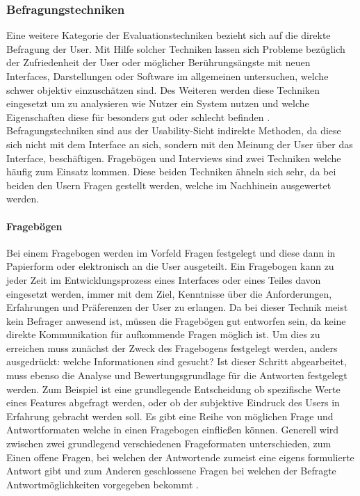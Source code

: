 \documentclass[draft=false
              ,paper=a4
              ,twoside=false
              ,fontsize=11pt
              ,headsepline
              ,BCOR10mm
              ,DIV11
              ]{scrbook}
\begin{document}
\subsubsection{Befragungstechniken} %
\label{ssub:befragungstechniken}
Eine weitere Kategorie der Evaluationstechniken bezieht sich auf die direkte Befragung der User. Mit Hilfe solcher Techniken lassen sich Probleme bezüglich der Zufriedenheit der User oder möglicher Berührungsängste mit neuen Interfaces, Darstellungen oder Software im allgemeinen untersuchen, welche schwer objektiv einzuschätzen sind. Des Weiteren werden diese Techniken eingesetzt um zu analysieren wie Nutzer ein System nutzen und welche Eigenschaften diese für besonders gut oder schlecht befinden \cite{nielsen_usability_1994}. Befragungstechniken sind aus der Usability-Sicht indirekte Methoden, da diese sich nicht mit dem Interface an sich, sondern mit den Meinung der User über das Interface, beschäftigen. Fragebögen und Interviews sind zwei Techniken welche häufig zum Einsatz kommen. Diese beiden Techniken ähneln sich sehr, da bei beiden den Usern Fragen gestellt werden, welche im Nachhinein ausgewertet werden. 

\paragraph{Fragebögen} %
\label{par:fragebögen}
Bei einem Fragebogen werden im Vorfeld Fragen festgelegt und diese dann in Papierform oder elektronisch an die User ausgeteilt. Ein Fragebogen kann zu jeder Zeit im Entwicklungsprozess eines Interfaces oder eines Teiles davon eingesetzt werden, immer mit dem Ziel, Kenntnisse über die Anforderungen, Erfahrungen und Präferenzen der User zu erlangen. Da bei dieser Technik meist kein Befrager anwesend ist, müssen die Fragebögen gut entworfen sein, da keine direkte Kommunikation für aufkommende Fragen möglich ist. Um dies zu erreichen muss zunächst der Zweck des Fragebogens festgelegt werden, anders ausgedrückt: welche Informationen sind gesucht? Ist dieser Schritt abgearbeitet, muss ebenso die Analyse und Bewertungsgrundlage für die Antworten festgelegt werden. Zum Beispiel ist eine grundlegende Entscheidung ob spezifische Werte eines Features abgefragt werden, oder ob der subjektive Eindruck des Users in Erfahrung gebracht werden soll.
Es gibt eine Reihe von möglichen Frage und Antwortformaten welche in einen Fragebogen einfließen können. Generell wird zwischen zwei grundlegend verschiedenen Frageformaten unterschieden, zum Einen offene Fragen, bei welchen der Antwortende zumeist eine eigens formulierte Antwort gibt und zum Anderen geschlossene Fragen bei welchen der Befragte Antwortmöglichkeiten vorgegeben bekommt \cite{ader_advising_2008}.
\end{document}
